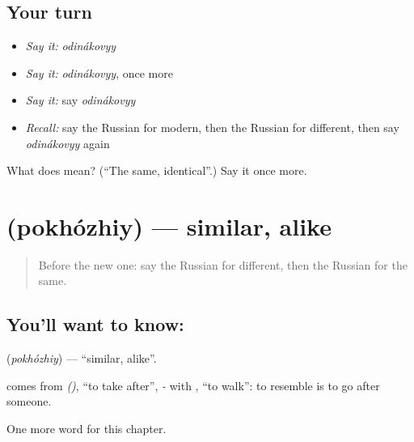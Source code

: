 \subsection*{Your turn}
\begin{itemize}
\raggedright
  \item \emph{Say it:} \emph{odinákovyy}
  \item \emph{Say it:} \emph{odinákovyy}, once more
  \item \emph{Say it:} say \emph{odinákovyy}
  \item \emph{Recall:} say the Russian for modern, then the Russian for different, then say \emph{odinákovyy} again
\end{itemize}

\begin{tcolorbox}[breakable,colback=teal!4,colframe=teal!35!black,title={Before you move on}]
What does  mean? (\textquotedblleft{}The same, identical\textquotedblright{}.) Say it once more.
\end{tcolorbox}
\section[\texorpdfstring{\ru{похожий} (pokhózhiy)}{похожий (pokhózhiy)}]{ (pokhózhiy) — similar, alike}

\label{lesson:RU-C218-pokhozhiy}



\begin{quote}
Before the new one: say the Russian for different, then the Russian for the same.
\end{quote}

\subsection*{You'll want to know: }
\textbf{} (\emph{pokhózhiy}) — \textquotedblleft{}similar, alike\textquotedblright{}.

\begin{cousinweb}
\textbf{} comes from \emph{ ()}, \textquotedblleft{}to take after\textquotedblright{}, \emph{-} with \emph{}, \textquotedblleft{}to walk\textquotedblright{}: to resemble is to go after someone.
\end{cousinweb}

\begin{grammarlens}[title={What you've built}]
One more word for this chapter.
\end{grammarlens}

